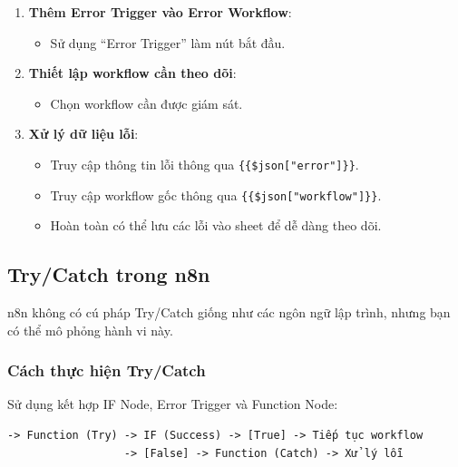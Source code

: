 \begin{enumerate}
  \item \textbf{Thêm Error Trigger vào Error Workflow}:
  \begin{itemize}
    \item Sử dụng ``Error Trigger'' làm nút bắt đầu.
  \end{itemize}

  \item \textbf{Thiết lập workflow cần theo dõi}:
  \begin{itemize}
    \item Chọn workflow cần được giám sát.
  \end{itemize}

  \item \textbf{Xử lý dữ liệu lỗi}:
  \begin{itemize}
    \item Truy cập thông tin lỗi thông qua \texttt{\{\{\$json["error"]\}\}}.
    \item Truy cập workflow gốc thông qua \texttt{\{\{\$json["workflow"]\}\}}.
    \item Hoàn toàn có thể lưu các lỗi vào sheet để dễ dàng theo dõi.
  \end{itemize}
\end{enumerate}


\subsection{Try/Catch trong n8n}

n8n không có cú pháp Try/Catch giống như các ngôn ngữ lập trình, nhưng bạn có thể mô phỏng hành vi này.

\subsubsection{Cách thực hiện Try/Catch}

Sử dụng kết hợp IF Node, Error Trigger và Function Node:

\begin{verbatim}
-> Function (Try) -> IF (Success) -> [True] -> Tiếp tục workflow
                  -> [False] -> Function (Catch) -> Xử lý lỗi
\end{verbatim}

